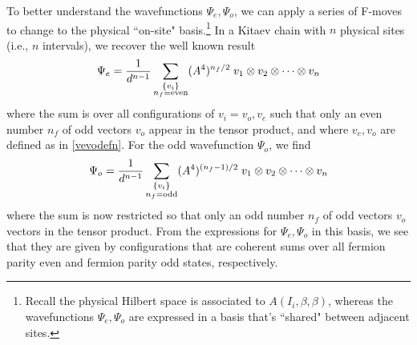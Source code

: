 To better understand the wavefunctions $\Psi_e,\Psi_o$, we can apply a series of F-moves to change to the physical ``on-site" basis.\footnote{Recall the physical Hilbert space is associated to $A(I_i,\beta, \beta)$, 
whereas the wavefunctions $\Psi_e,\Psi_o$ are expressed in a basis that's ``shared" between adjacent sites.}
In a Kitaev chain with $n$ physical sites (i.e., $n$ intervals), 
we recover the well known result
\begin{align}
\Psi_e = \frac{1}{d^{n-1}} \sum_{\substack{ \{ v_i\} \\  n_f = \text{even} }} (A^4)^{n_f/2} \; v_1 \otimes v_2 \otimes \cdots \otimes v_n
\end{align}
where the sum is over all configurations of $v_i =v_o,v_e$ such that only an even number $n_f$ of odd vectors $v_o$ appear 
in the tensor product, and where $v_e,v_o$ are defined as in \eqref{vevodefn}.
For the odd wavefunction $\Psi_o$, we find 
\begin{align}
\Psi_o = \frac{1}{d^{n-1}}\sum_{\substack{ \{ v_i\} \\  n_f = \text{odd} }}  (A^4)^{(n_f-1)/2}\; v_1 \otimes v_2 \otimes \cdots \otimes v_n
\end{align}
where the sum is now restricted so that only an odd number $n_f$ of odd vectors $v_o$ vectors in the tensor product.
From the expressions for $\Psi_e,\Psi_o$ in this basis, we see that they are given by configurations 
that are coherent sums over all fermion parity even and fermion parity odd states, respectively.  


